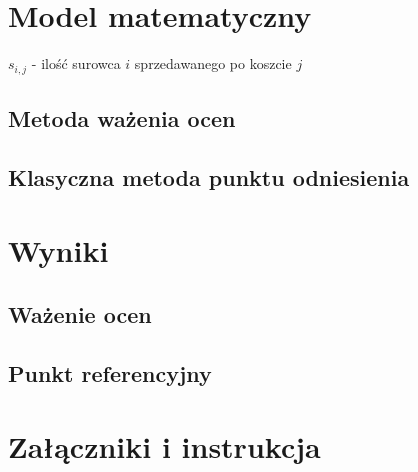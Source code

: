 \documentclass[a4paper, 10pt]{article}
\begin{document}
\section{Model matematyczny}


$s_{i,j}$  - ilość surowca $i$ sprzedawanego po koszcie $j$



\subsection{Metoda ważenia ocen}

\subsection{Klasyczna metoda punktu odniesienia}

\section{Wyniki}

\subsection{Ważenie ocen}

\subsection{Punkt referencyjny}


\section{Załączniki i instrukcja}
\end{document}
